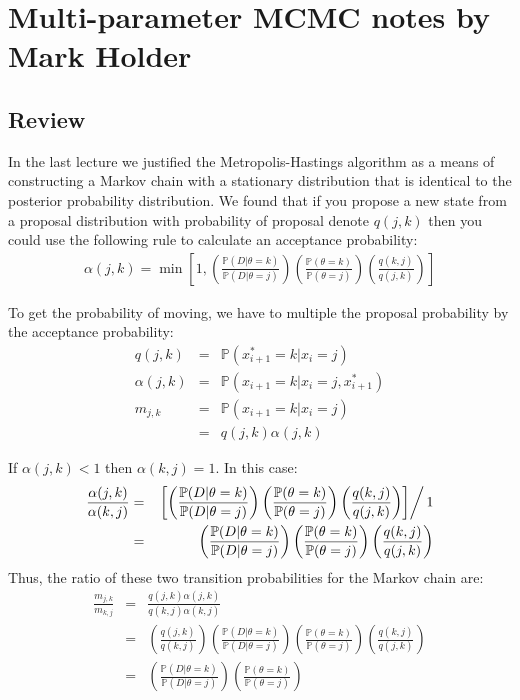 \documentclass[11pt]{article}
\newcommand{\prop}[2]{q(#1,#2)}
\newcommand{\accept}[2]{\alpha({#1,#2})}
\renewcommand{\Pr}{{\mathbb P}}
\begin{document}

\section*{Multi-parameter MCMC notes by Mark Holder}
\subsection*{Review}
In the last lecture we justified the Metropolis-Hastings algorithm as a means of constructing a Markov chain with a stationary distribution that is identical to the posterior probability distribution.
We found that if you propose a new state from a proposal distribution with probability of proposal denote $\prop{j}{k}$ then you could use the following rule to calculate an acceptance probability:
\begin{eqnarray*}
	\accept{j}{k} = \min\left[1, \left(\frac{\Pr(D|\theta=k)}{\Pr(D|\theta=j)}\right)\left(\frac{\Pr(\theta=k)}{\Pr(\theta=j)}\right)\left(\frac{\prop{k}{j}}{\prop{j}{k}}\right)\right]
\end{eqnarray*}

To get the probability of moving, we have to multiple the proposal probability by the acceptance probability:
\begin{eqnarray*}
	\prop{j}{k} & = & \Pr(x_{i+1}^{\ast}=k|x_i = j) \\
	\accept{j}{k}  & = & \Pr(x_{i+1}=k|x_i = j,x_{i+1}^{\ast}) \\
	m_{j,k} & = & \Pr(x_{i+1}=k|x_i = j) \\
		 & = & \prop{j}{k}\accept{j}{k}
\end{eqnarray*}

If $\accept{j}{k} < 1$ then $\accept{k}{j} = 1$.  
In this case:
\begin{eqnarray*}
	\frac{\accept{j}{k}}{\accept{k}{j}} & = & \left.\left[\left(\frac{\Pr(D|\theta=k)}{\Pr(D|\theta=j)}\right)\left(\frac{\Pr(\theta=k)}{\Pr(\theta=j)}\right)\left(\frac{\prop{k}{j}}{\prop{j}{k}}\right)\right]\right/1 \\
	& = & \left(\frac{\Pr(D|\theta=k)}{\Pr(D|\theta=j)}\right)\left(\frac{\Pr(\theta=k)}{\Pr(\theta=j)}\right)\left(\frac{\prop{k}{j}}{\prop{j}{k}}\right)
\end{eqnarray*}
Thus, the ratio of these two transition probabilities for the Markov chain are:
\begin{eqnarray*}
	\frac{m_{j,k}}{m_{k,j}} & = & \frac{\prop{j}{k}\accept{j}{k}}{\prop{k}{j}\accept{k}{j}} \\
		& = & \left(\frac{\prop{j}{k}}{\prop{k}{j}}\right)\left(\frac{\Pr(D|\theta=k)}{\Pr(D|\theta=j)}\right)\left(\frac{\Pr(\theta=k)}{\Pr(\theta=j)}\right)\left(\frac{\prop{k}{j}}{\prop{j}{k}}\right) \\
		& = & \left(\frac{\Pr(D|\theta=k)}{\Pr(D|\theta=j)}\right)\left(\frac{\Pr(\theta=k)}{\Pr(\theta=j)}\right)
\end{eqnarray*}
\end{document}
